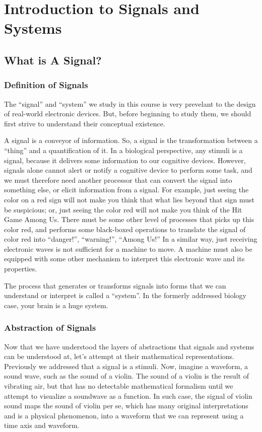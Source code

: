
\chapter{Introduction to Signals and Systems}

\section{What is A Signal?}

\subsection{Definition of Signals}
The ``signal'' and ``system'' we study in this course is very prevelant to the design of real-world electronic devices.
But, before beginning to study them, we should first strive to understand their conceptual existence.

A signal is a conveyor of information. So, a signal is the transformation between a ``thing'' and a quantification of it.
In a biological perspective, any stimuli is a signal, because it delivers some information to our cognitive devices.
However, signals alone cannot alert or notify a cognitive device to perform some task, and we must therefore need another processor that can convert the signal into something else, or elicit information from a signal.
For example, just seeing the color on a red sign will not make you think that what lies beyond that sign must be suspicious; or, just seeing the color red will not make you think of the Hit Game Among Us.
There must be some other level of processes that picks up this color red, and performs some black-boxed operations to translate the signal of color red into ``danger!'', ``warning!'', ``Among Us!''
In a similar way, just receiving electronic waves is not sufficient for a machine to move. A machine must also be equipped with some other mechanism to interpret this electronic wave and its properties.

The process that generates or transforms signals into forms that we can understand or interpret is called a ``system''. In the formerly addressed biology case, your brain is a huge system.

\subsection{Abstraction of Signals}
Now that we have understood the layers of abstractions that signals and systems can be understood at, let's attempt at their mathematical representations.
Previously we addressed that a signal is a stimuli.
Now, imagine a waveform, a sound wave, such as the sound of a violin. The sound of a violin is the result of vibrating air, but that has no detectable mathematical formalism until we attempt to visualize a soundwave as a function.
In such case, the signal of violin sound maps the sound of violin per se, which has many original interpretations and is a physical phenomenon, into a waveform that we can represent using a time axis and waveform.

